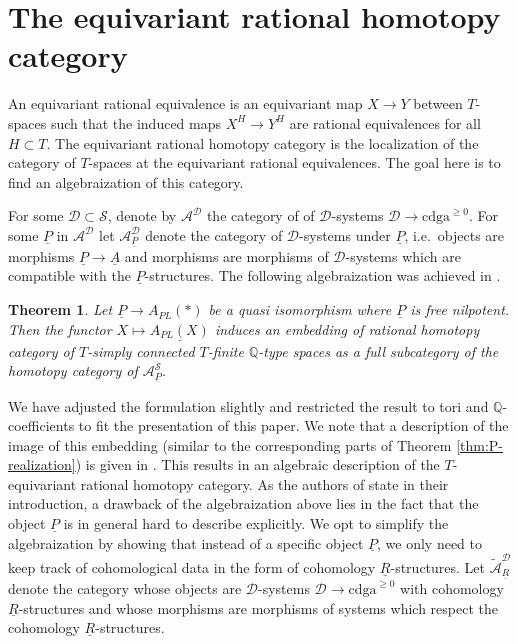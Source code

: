 \documentclass[12pt,a4paper]{article}
\newtheorem{thm}{Theorem}[section]
\theoremstyle{definition}
\begin{document}
\section{The equivariant rational homotopy category}\label{sec:homcats}

An equivariant rational equivalence is an equivariant map $X\rightarrow Y$ between $T$-spaces such that the induced maps $X^H\rightarrow Y^H$ are rational equivalences for all $H\subset T$. The equivariant rational homotopy category is the localization of the category of $T$-spaces at the equivariant rational equivalences. The goal here is to find an algebraization of this category.

For some $\mathcal{D}\subset \mathcal{S}$, denote by $\mathcal{A}^{\mathcal{D}}$ the category of of $\mathcal{D}$-systems $\mathcal{D}\rightarrow \mathrm{cdga}^{\geq 0}$. For some $\underline{P}$ in $\mathcal{A}^{\mathcal{D}}$ let $\mathcal{A}^{\mathcal{D}}_{\underline{P}}$ denote the category of $\mathcal{D}$-systems under $\underline{P}$, i.e.\ objects are morphisms $\underline{P}\rightarrow \underline{A}$ and morphisms are morphisms of $\mathcal{D}$-systems which are compatible with the $\underline{P}$-structures. The following algebraization was achieved in \cite[Theorem 4.4]{ScullMendes}.

\begin{thm}\label{thm:scullmendes}
Let $\underline{P}\rightarrow A_{PL}(*)$ be a quasi isomorphism where $\underline{P}$ is free nilpotent. Then the functor $X\mapsto \underline{A_{PL}(X)}$ induces an embedding of rational homotopy category of $T$-simply connected $T$-finite $\mathbb{Q}$-type spaces as a full subcategory of the homotopy category of $\mathcal{A}_{\underline{P}}^{\mathcal{S}}$.
\end{thm}

We have adjusted the formulation slightly and restricted the result to tori and $\mathbb{Q}$-coefficients to fit the presentation of this paper. We note that a description of the image of this embedding (similar to the corresponding parts of Theorem \ref{thm:P-realization}) is given in \cite[Theorem 3.7]{ScullMendes}. This results in an algebraic description of the $T$-equivariant rational homotopy category. As the authors of \cite{ScullMendes} state in their introduction, a drawback of the algebraization above lies in the fact that the object $\underline{P}$ is in general hard to describe explicitly. We opt to simplify the algebraization by showing that instead of a specific object $\underline{P}$, we only need to keep track of cohomological data in the form of cohomology $\underline{R}$-structures. Let $\widetilde{\mathcal{A}}^{\mathcal{D}}_{\underline{R}}$ denote the category whose objects are $\mathcal{D}$-systems $\mathcal{D}\rightarrow\mathrm{cdga}^{\geq 0}$ with cohomology $\underline{R}$-structures and whose morphisms are morphisms of systems which respect the cohomology $\underline{R}$-structures.
\end{document}
